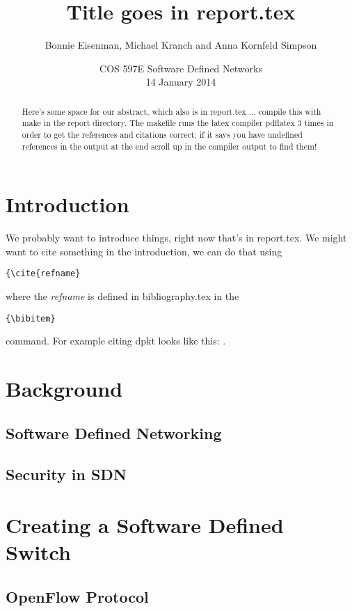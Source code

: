 \documentclass[12pt, letterpaper, twoside]{article}
\title{Title goes in report.tex}
\author{Bonnie Eisenman, Michael Kranch and Anna Kornfeld Simpson}
\date{COS 597E Software Defined Networks \\ 14 January 2014}
\begin{document}
\maketitle

\begin{spacing}{1.0}

\begin{abstract}
Here's some space for our abstract, which also is in report.tex ... compile this with make in the report directory.  The makefile runs the latex compiler pdflatex 3 times in order to get the references and citations correct; if it says you have undefined references in the output at the end scroll up in the compiler output to find them!
\end{abstract}

\begin{multicols}{2}

\section{Introduction}
We probably want to introduce things, right now that's in report.tex.  We might want to cite something in the introduction, we can do that using \begin{verbatim}{\cite{refname}\end{verbatim} where the \emph{refname} is defined in bibliography.tex in the \begin{verbatim}{\bibitem}\end{verbatim} command.  For example citing dpkt looks like this: \cite{dpkt}.

\section{Background}

\subsection{Software Defined Networking}

\subsection{Security in SDN}

\section{Creating a Software Defined Switch}

\subsection{OpenFlow Protocol}


\end{multicols}
\end{spacing}
\end{document}
